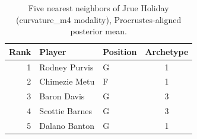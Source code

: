 \begin{table}[htbp]
  \centering\small
  \begin{tabular}{rllc}
    \toprule
    Rank & Player & Position & Archetype \\
    \midrule
    1 & Rodney Purvis & G & 1 \\
    2 & Chimezie Metu & F & 1 \\
    3 & Baron Davis & G & 3 \\
    4 & Scottie Barnes & G & 3 \\
    5 & Dalano Banton & G & 1 \\
    \bottomrule
  \end{tabular}
  \caption{Five nearest neighbors of Jrue Holiday (curvature_m4 modality), Procrustes-aligned posterior mean.}
  \label{tab:Jrue_Holiday_neighbors_curvature_m4}
\end{table}

